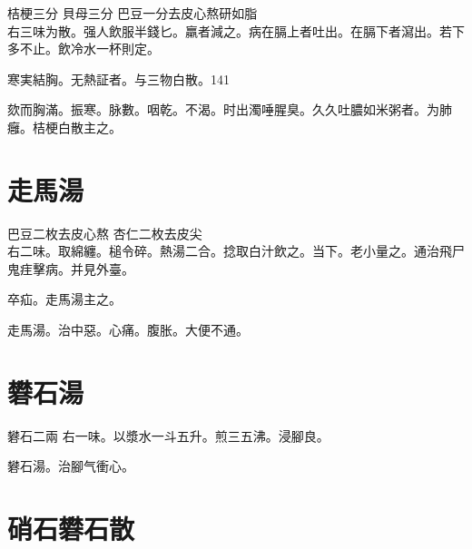 桔梗{\scriptsize 三分} 貝母{\scriptsize 三分} 巴豆{\scriptsize 一分去皮心熬研如脂}\\
右三味为散。强人飲服半錢匕。羸者減之。病在膈上者吐出。在膈下者瀉出。若下多不止。飲冷水一杯則定。

寒実結胸。无熱証者。与三物白散。141

欬而胸滿。振寒。脉數。咽乾。不渴。时出濁唾腥臭。久久吐膿如米粥者。为肺癰。桔梗白散主之。

\section{走馬湯}

巴豆{\scriptsize 二枚去皮心熬} 杏仁{\scriptsize 二枚{\khaaitp 去皮尖}}\\
右二味。取綿纏。槌令碎。熱湯二合。捻取白汁飲之。当下。老小量之。通治飛尸鬼{\khaaitp 疰}擊病。{\scriptsize {\khaaitp 并見外臺。}}

卒疝。走馬湯主之。{\wuben}

走馬湯。治中惡。心痛。腹胀。大便不通。{\dengben}



\section{礬石湯}

礬石{\scriptsize 二兩} 
右一味。以漿水一斗五升。煎三五沸。浸腳良。

礬石湯。治腳气衝心。

\section{硝石礬石散}

